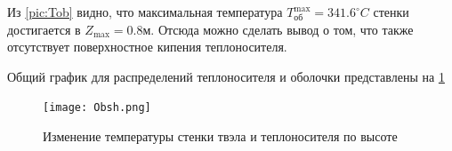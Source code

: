  Из \ref{pic:Tob} 
 видно, что максимальная температура $T_{\text{об}}^{\max} = 341.6 ^\circ C $ стенки достигается в $Z_{\max} = 0.8 м$. Отсюда можно сделать вывод о том, что также отсутствует поверхностное кипения теплоносителя.

Общий график для распределений теплоносителя и оболочки представлены на \ref{pic:obsh}
\begin{figure}[H]
	\begin{center}
		\texttt{[image: Obsh.png]}
		\caption{Изменение температуры стенки твэла и теплоносителя по высоте}
		\label{pic:obsh} %
	\end{center}
\end{figure}
    

